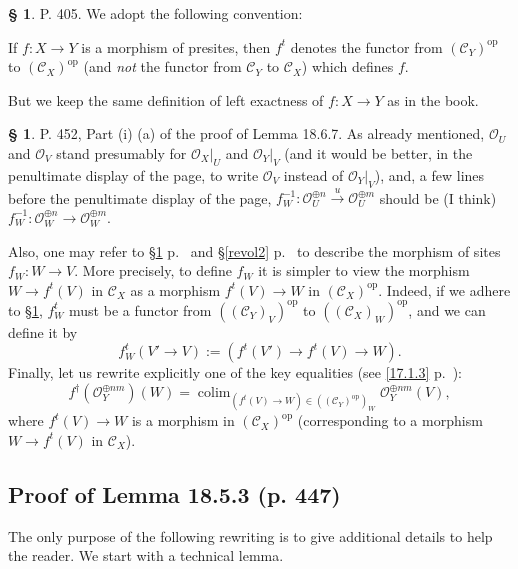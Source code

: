 \documentclass[12pt]{article}
\theoremstyle{remark}
\theoremstyle{definition}
\newtheorem{s}[thm]{\S}
\newcommand{\cc}{\mathcal}
\newcommand{\C}{\mathcal C}
\newcommand{\xr}{\xrightarrow}
\DeclareMathOperator*{\co}{colim}
\DeclareMathOperator{\op}{op}
\begin{document}
%
%
\begin{s}\label{revol}
P. 405. We adopt the following convention: 

If $f:X\to Y$ is a morphism of presites, then $f^t$ denotes the functor from $(\C_Y)^{\op}$ to $(\C_X)^{\op}$ (and {\em not} the functor from $\C_Y$ to $\C_X$) which defines $f$.

But we keep the same definition of left exactness of $f:X\to Y$ as in the book.
\end{s}
%
%
\begin{s} 
P. 452, Part (i) (a) of the proof of Lemma 18.6.7. As already mentioned, $\cc O_U$ and $\cc O_V$ stand presumably for $\cc O_X|_U$ and $\cc O_Y|_V$ (and it would be better, in the penultimate display of the page, to write $\cc O_V$ instead of $\cc O_Y|_V$), and, a few lines before the penultimate display of the page, $f_W^{-1}:\cc O_U^{\oplus n}\xr u\cc O_U^{\oplus m}$ should be (I think) $f_W^{-1}:\cc O_W^{\oplus n}\to\cc O_W^{\oplus m}$. 

Also, one may refer to \S\ref{revol} p.~\pageref{revol} and \S\ref{revol2} p.~\pageref{revol2} to describe the morphism of sites $f_W:W\to V$. More precisely, to define $f_W$ it is simpler to view the morphism $W\to f^t(V)$ in $\C_X$ as a morphism $f^t(V)\to W$ in $(\C_X)^{\op}$. Indeed, if we adhere to \S\ref{revol}, $f_W^t$ must be a functor from $((\C_Y)_V)^{\op}$ to $((\C_X)_W)^{\op}$, and we can define it by 
$$
f_W^t(V'\to V):=(f^t(V')\to f^t(V)\to W).
$$
Finally, let us rewrite explicitly one of the key equalities (see \eqref{17.1.3} p.~\pageref{17.1.3}): 
$$
f^\dagger(\cc O_Y^{\oplus nm})(W)=\co_{(f^t(V)\to W)\in((\C_Y)^{\op})_W}\cc O_Y^{\oplus nm}(V),
$$ 
where $f^t(V)\to W$ is a morphism in $(\C_X)^{\op}$ (corresponding to a morphism $W\to f^t(V)$ in $\C_X$).
\end{s}
%
\subsection{Proof of Lemma 18.5.3 (p. 447)}
%
The only purpose of the following rewriting is to give additional details to help the reader. We start with a technical lemma.
\end{document}
